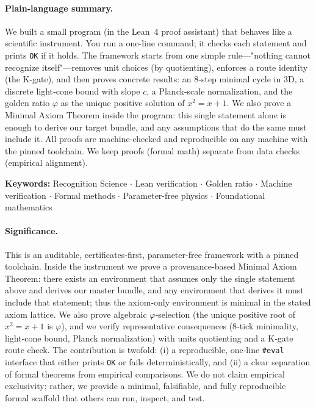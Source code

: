 \documentclass[11pt,a4paper,twoside]{article}
\numberwithin{equation}{section}
\theoremstyle{customthm}
\theoremstyle{customdef}
\theoremstyle{customrem}
\begin{document}
\paragraph{Plain-language summary.} We built a small program (in the Lean~4 proof assistant) that behaves like a scientific instrument. You run a one-line command; it checks each statement and prints \texttt{OK} if it holds. The framework starts from one simple rule—"nothing cannot recognize itself"—removes unit choices (by quotienting), enforces a route identity (the K-gate), and then proves concrete results: an 8‑step minimal cycle in 3D, a discrete light‑cone bound with slope $c$, a Planck‑scale normalization, and the golden ratio $\varphi$ as the unique positive solution of $x^2 = x + 1$. We also prove a Minimal Axiom Theorem inside the program: this single statement alone is enough to derive our target bundle, and any assumptions that do the same must include it. All proofs are machine‑checked and reproducible on any machine with the pinned toolchain. We keep proofs (formal math) separate from data checks (empirical alignment).

\vspace{1em}
\noindent\textbf{Keywords:} Recognition Science $\cdot$ Lean verification $\cdot$ Golden ratio $\cdot$ Machine verification $\cdot$ Formal methods $\cdot$ Parameter-free physics $\cdot$ Foundational mathematics


\paragraph{Significance.} This is an auditable, certificates‑first, parameter‑free framework with a pinned toolchain. Inside the instrument we prove a provenance‑based Minimal Axiom Theorem: there exists an environment that assumes only the single statement above and derives our master bundle, and any environment that derives it must include that statement; thus the axiom‑only environment is minimal in the stated axiom lattice. We also prove algebraic $\varphi$‑selection (the unique positive root of $x^2 = x + 1$ is $\varphi$), and we verify representative consequences (8‑tick minimality, light‑cone bound, Planck normalization) with units quotienting and a K‑gate route check. The contribution is twofold: (i) a reproducible, one‑line \texttt{\#eval} interface that either prints \texttt{OK} or fails deterministically, and (ii) a clear separation of formal theorems from empirical comparisons. We do not claim empirical exclusivity; rather, we provide a minimal, falsifiable, and fully reproducible formal scaffold that others can run, inspect, and test.
\end{document}
